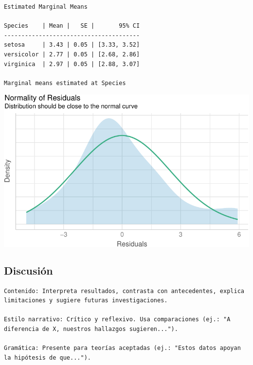 \documentclass[
]{article}
\begin{document}
\begin{verbatim}
Estimated Marginal Means

Species    | Mean |   SE |       95% CI
---------------------------------------
setosa     | 3.43 | 0.05 | [3.33, 3.52]
versicolor | 2.77 | 0.05 | [2.68, 2.86]
virginica  | 2.97 | 0.05 | [2.88, 3.07]

Marginal means estimated at Species
\end{verbatim}

\includegraphics{template_files/figure-pdf/unnamed-chunk-12-1.pdf}

\subsection{Discusión}\label{discusiuxf3n}

\begin{tcolorbox}[enhanced jigsaw, colbacktitle=quarto-callout-tip-color!10!white, opacitybacktitle=0.6, breakable, toprule=.15mm, bottomrule=.15mm, leftrule=.75mm, toptitle=1mm, opacityback=0, colback=white, colframe=quarto-callout-tip-color-frame, coltitle=black, bottomtitle=1mm, titlerule=0mm, title=\textcolor{quarto-callout-tip-color}{\faLightbulb}\hspace{0.5em}{Tip}, arc=.35mm, rightrule=.15mm, left=2mm]

\begin{verbatim}
Contenido: Interpreta resultados, contrasta con antecedentes, explica limitaciones y sugiere futuras investigaciones.

Estilo narrativo: Crítico y reflexivo. Usa comparaciones (ej.: "A diferencia de X, nuestros hallazgos sugieren...").

Gramática: Presente para teorías aceptadas (ej.: "Estos datos apoyan la hipótesis de que...").
\end{verbatim}

\end{tcolorbox}
\end{document}
